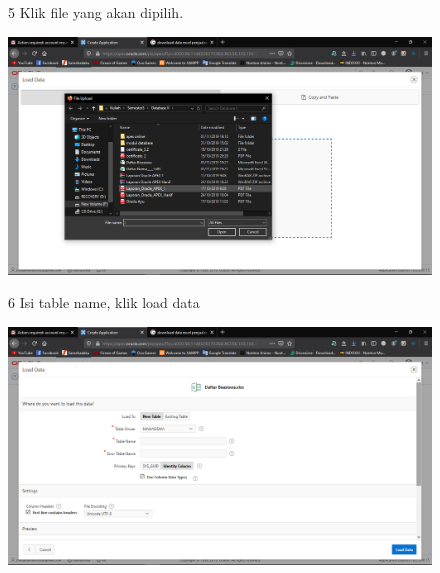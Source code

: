 \begin{enumerate}
\begin{figure}[!htbp]    
\item[5] Klik file yang akan dipilih.
\begin{center}
    \includegraphics[scale=0.3]{section/Screenshot(32).png}
    \end{center}
    \end{figure}
    
\begin{figure}[!htbp]
\item[6] Isi table  name, klik load data
\begin{center}
    \includegraphics[scale=0.3]{section/Screenshot(33).png}
    \end{center}
    \end{figure}
    

\end{enumerate}
